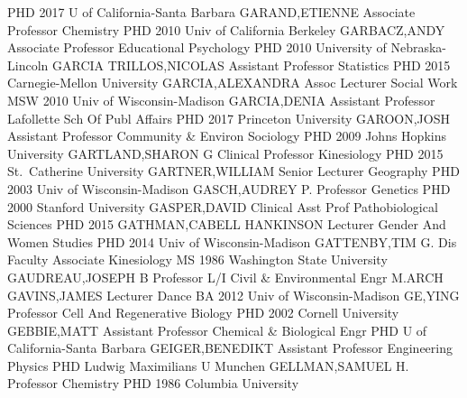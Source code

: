\documentclass[
]{article}
\begin{document}
\textbar{}  \textbar PHD 2017 U of California-Santa Barbara
\textbar GARAND,ETIENNE \textbar Associate Professor \textbar Chemistry
\textbar{}  \textbar PHD 2010 Univ of California Berkeley
\textbar GARBACZ,ANDY \textbar Associate Professor \textbar Educational
Psychology \textbar{}  \textbar PHD 2010 University of
Nebraska-Lincoln \textbar GARCIA TRILLOS,NICOLAS \textbar Assistant
Professor \textbar Statistics \textbar{}  \textbar PHD 2015
Carnegie-Mellon University \textbar GARCIA,ALEXANDRA \textbar Assoc
Lecturer \textbar Social Work \textbar{}  \textbar MSW 2010
Univ of Wisconsin-Madison \textbar GARCIA,DENIA \textbar Assistant
Professor \textbar Lafollette Sch Of Publ Affairs \textbar{}
 \textbar PHD 2017 Princeton University \textbar GAROON,JOSH
\textbar Assistant Professor \textbar Community \& Environ Sociology
\textbar{}  \textbar PHD 2009 Johns Hopkins University
\textbar GARTLAND,SHARON G \textbar Clinical Professor
\textbar Kinesiology \textbar{}  \textbar PHD 2015
St.~Catherine University \textbar GARTNER,WILLIAM \textbar Senior
Lecturer \textbar Geography \textbar{}  \textbar PHD 2003
Univ of Wisconsin-Madison \textbar GASCH,AUDREY P. \textbar Professor
\textbar Genetics \textbar{}  \textbar PHD 2000 Stanford
University \textbar GASPER,DAVID \textbar Clinical Asst Prof
\textbar Pathobiological Sciences \textbar{}  \textbar PHD
2015 \textbar GATHMAN,CABELL HANKINSON \textbar Lecturer \textbar Gender
And Women Studies \textbar{}  \textbar PHD 2014 Univ of
Wisconsin-Madison \textbar GATTENBY,TIM G. \textbar Dis Faculty
Associate \textbar Kinesiology \textbar{}  \textbar MS 1986
Washington State University \textbar GAUDREAU,JOSEPH B
\textbar Professor L/I \textbar Civil \& Environmental Engr \textbar{}
 \textbar M.ARCH \textbar GAVINS,JAMES \textbar Lecturer
\textbar Dance \textbar{}  \textbar BA 2012 Univ of
Wisconsin-Madison \textbar GE,YING \textbar Professor \textbar Cell And
Regenerative Biology \textbar{}  \textbar PHD 2002 Cornell
University \textbar GEBBIE,MATT \textbar Assistant Professor
\textbar Chemical \& Biological Engr \textbar{} 
\textbar PHD U of California-Santa Barbara \textbar GEIGER,BENEDIKT
\textbar Assistant Professor \textbar Engineering Physics \textbar{}
 \textbar PHD Ludwig Maximilians U Munchen
\textbar GELLMAN,SAMUEL H. \textbar Professor \textbar Chemistry
\textbar{}  \textbar PHD 1986 Columbia University
\end{document}
